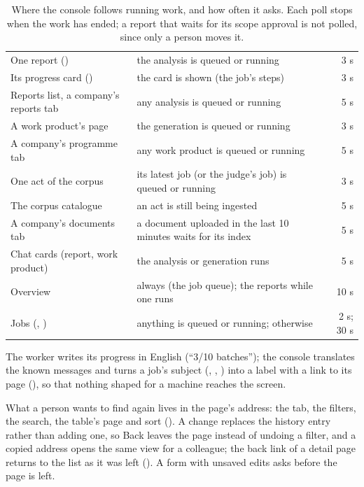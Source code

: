 \begin{table}[H]
\caption{Where the console follows running work, and how often it asks. Each poll stops when the
work has ended; a report that waits for its scope approval is not polled, since only a person
moves it.}\label{tab:console:polling}
\begin{tabularx}{\textwidth}{@{}L{48mm}Yr@{}}
\toprule
{} &  &  \\
\midrule
One report () & the analysis is queued or running & 3 s \\
Its progress card () & the card is shown (the job's steps) & 3 s \\
Reports list, a company's reports tab & any analysis is queued or running & 5 s \\
A work product's page & the generation is queued or running & 3 s \\
A company's programme tab & any work product is queued or running & 5 s \\
One act of the corpus & its latest job (or the judge's job) is queued or running & 3 s \\
The corpus catalogue & an act is still being ingested & 5 s \\
A company's documents tab & a document uploaded in the last 10 minutes waits for its index & 5 s \\
Chat cards (report, work product) & the analysis or generation runs & 5 s \\
Overview & always (the job queue); the reports while one runs & 10 s \\
Jobs (, ) & anything is queued or running; otherwise & 2 s; 30 s \\
\bottomrule
\end{tabularx}
\end{table}

The worker writes its progress in English (\enquote{3/10 batches}); the console translates
the known messages and turns a job's subject (, ,
) into a label with a link to its page (), so that
nothing shaped for a machine reaches the screen.

What a person wants to find again lives in the page's address: the tab, the filters, the
search, the table's page and sort (). A change replaces the
history entry rather than adding one, so Back leaves the page instead of undoing a filter, and
a copied address opens the same view for a colleague; the back link of a detail page returns
to the list as it was left (). A form with unsaved edits asks
before the page is left.

